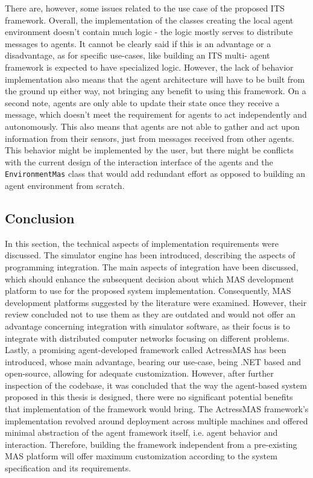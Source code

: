 \documentclass[0main.tex]{subfiles}
\begin{document}
There are, however, some issues related to the use case of the proposed ITS framework. Overall, the implementation of the classes 
creating the local agent environment doesn't contain much logic - the logic mostly serves to distribute messages to agents. 
It cannot be clearly said if this is an advantage or a disadvantage, as for specific use-cases, like building an ITS multi-
agent framework is expected to have specialized logic. However, the lack of behavior implementation also means that the 
agent architecture will have to be built from the ground up either way, not bringing any benefit to using this framework. 
On a second note, agents are only able to update their state once they receive a message, which doesn't 
meet the requirement for agents to act independently and autonomously. This also means that agents are not able to gather 
and act upon information from their sensors, just from messages received from other agents. This behavior might be implemented 
by the user, but there might be conflicts with the current design of the interaction interface of the agents and the 
\texttt{EnvironmentMas} class that would add redundant effort as opposed to building an agent environment from scratch. 

\subsection{Conclusion}

In this section, the technical aspects of implementation requirements were discussed. The
simulator engine has been introduced, describing the aspects of programming integration. The main
aspects of integration have been discussed, which should enhance the subsequent decision about
which MAS development platform to use for the proposed system implementation. Consequently, MAS
development platforms suggested by the literature were examined.  However, their review concluded
not to use them as they are outdated and would not offer an advantage concerning integration
with simulator software, as their focus is to integrate with distributed computer networks
focusing on different problems. Lastly, a promising agent-developed framework called 
ActressMAS has been introduced, whose main advantage, bearing our use-case, being .NET based
and open-source, allowing for adequate customization. However, after further inspection of the
codebase, it was concluded that the way the agent-based system proposed in this thesis is
designed, there were no significant potential benefits that implementation of the framework 
would bring. The ActressMAS framework's implementation revolved around deployment across 
multiple machines and offered minimal abstraction of the agent framework itself, i.e. 
agent behavior and interaction. Therefore, building the framework independent from a
pre-existing MAS platform will offer maximum customization according to the system
specification and its requirements. 

\clearpage
\end{document}
